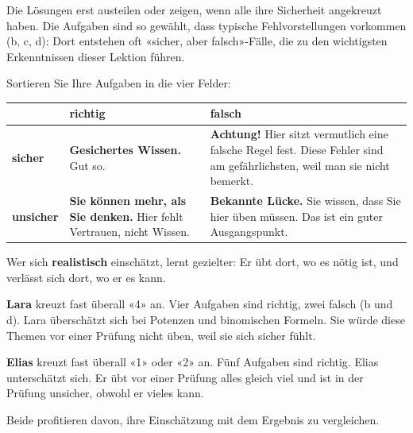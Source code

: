 \documentclass[11pt]{exam}
\begin{document}
\begin{lehrperson}
Die Lösungen erst austeilen oder zeigen, wenn alle ihre Sicherheit
angekreuzt haben. Die Aufgaben sind so gewählt, dass typische
Fehlvorstellungen vorkommen (b, c, d): Dort entstehen oft «sicher, aber
falsch»-Fälle, die zu den wichtigsten Erkenntnissen dieser Lektion führen.
\end{lehrperson}

\begin{merke}
Sortieren Sie Ihre Aufgaben in die vier Felder:

\begin{center}
\renewcommand{\arraystretch}{1.5}
\begin{tabular}{|p{2.2cm}|p{5.4cm}|p{5.4cm}|}
  \hline
  & \textbf{richtig} & \textbf{falsch} \\ \hline
  \textbf{sicher} &
    \textbf{Gesichertes Wissen.} Gut so. &
    \textbf{Achtung!} Hier sitzt vermutlich eine falsche Regel fest. Diese
    Fehler sind am gefährlichsten, weil man sie nicht bemerkt. \\ \hline
  \textbf{unsicher} &
    \textbf{Sie können mehr, als Sie denken.} Hier fehlt Vertrauen, nicht
    Wissen. &
    \textbf{Bekannte Lücke.} Sie wissen, dass Sie hier üben müssen. Das ist
    ein guter Ausgangspunkt. \\ \hline
\end{tabular}
\end{center}

Wer sich \textbf{realistisch} einschätzt, lernt gezielter: Er übt dort, wo es
nötig ist, und verlässt sich dort, wo er es kann.
\end{merke}

\begin{beispiel}
\textbf{Lara} kreuzt fast überall «4» an. Vier Aufgaben sind richtig, zwei
falsch (b und d). Lara überschätzt sich bei Potenzen und binomischen Formeln.
Sie würde diese Themen vor einer Prüfung nicht üben, weil sie sich sicher
fühlt.

\textbf{Elias} kreuzt fast überall «1» oder «2» an. Fünf Aufgaben sind richtig.
Elias unterschätzt sich. Er übt vor einer Prüfung alles gleich viel und ist
in der Prüfung unsicher, obwohl er vieles kann.

Beide profitieren davon, ihre Einschätzung mit dem Ergebnis zu vergleichen.
\end{beispiel}
\end{document}
